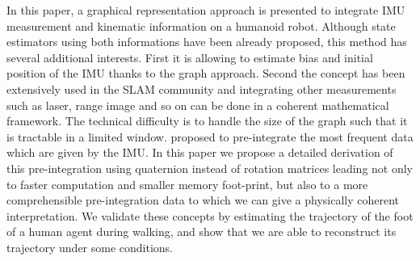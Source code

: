 %
%
In this paper, a graphical representation approach is presented to integrate 
IMU measurement and kinematic information on a humanoid robot. Although state estimators using both
informations \cite{Johnson:jof:2016,Fallon:ichr:2014} have been already proposed, this method has several additional interests.
First it is allowing to estimate bias and initial position of the IMU thanks to the graph
approach. Second the concept has been extensively used in the SLAM community and integrating 
other measurements such as laser, range image and so on can be done in a coherent mathematical framework.
The technical difficulty is to handle the size of the graph such that it is tractable in a limited window.
\cite{forster2015imu} proposed to pre-integrate the most frequent data which are given by the IMU.
In this paper we propose a detailed derivation of this pre-integration using quaternion instead
of rotation matrices leading not only to faster computation and smaller memory foot-print, but also to a more comprehensible pre-integration data to which we can give a physically coherent interpretation.
We validate these concepts by estimating the trajectory of the foot of a human agent during walking, and show that we are able to reconstruct its trajectory under some conditions.
